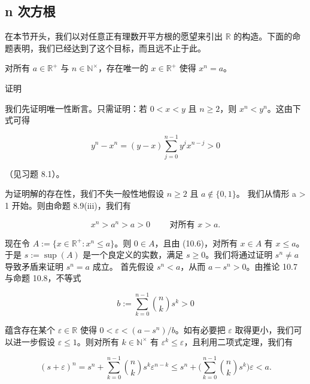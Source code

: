 \subsection*{n 次方根}

在本节开头，我们以对任意正有理数开平方根的愿望来引出 $ \mathbb{R} $ 的构造。下面的命题表明，我们已经达到了这个目标，而且远不止于此。

\begin{proposition}

对所有 $ a \in \mathbb{R}^+ $ 与 $ n \in \mathbb{N}^\times $，存在唯一的 $ x \in \mathbb{R}^+ $ 使得 $ x^n = a $。

证明

\begin{items}
\item

我们先证明唯一性断言。只需证明：若 $ 0 < x < y $ 且 $ n \geq 2 $，则 $ x^n < y^n $。这由下式可得

\begin{equation}
y^{n}-x^{n}=\left(y-x\right)\sum_{j=0}^{n-1}y^{j}x^{n-j}>0
\end{equation}

（见习题 8.1）。

\item

为证明解的存在性，我们不失一般性地假设 $ n \geq 2 $ 且 $ a \notin \{0,1\} $。
我们从情形 a > 1 开始。则由命题 8.9(iii)，我们有

\begin{equation}
x^{n}>a^{n}>a>0\qquad\text{ 对所有 }x>a.
\end{equation}

现在令 $ A := \{ x \in \mathbb{R}^+ : x^n \leq a \} $。则 $ 0 \in A $，且由 (10.6)，对所有 $ x \in A $ 有 $ x \leq a $。于是 $ s := \sup(A) $ 是一个良定义的实数，满足 $ s \geq 0 $。我们将通过证明 $ s^n \neq a $ 导致矛盾来证明 $ s^n = a $ 成立。
首先假设 $ s^{n} < a $，从而 $ a - s^{n} > 0 $。由推论 10.7 与命题 10.8，不等式

\[
b:=\sum_{k=0}^{n-1}{n\choose k}s^{k}>0
\]

蕴含存在某个 $ \varepsilon \in \mathbb{R} $ 使得 $ 0 < \varepsilon < (a - s^n)/b $。如有必要把 $ \varepsilon $ 取得更小，我们可以进一步假设 $ \varepsilon \leq 1 $。则对所有 $ k \in \mathbb{N}^\times $ 有 $ \varepsilon^k \leq \varepsilon $，且利用二项式定理，我们有

\[
(s+\varepsilon)^{n}=s^{n}+\sum_{k=0}^{n-1}\binom{n}{k}s^{k}\varepsilon^{n-k}\leq s^{n}+\Big(\sum_{k=0}^{n-1}\binom{n}{k}s^{k}\Big)\varepsilon<a.
\]


\end{items}
\end{proposition}
